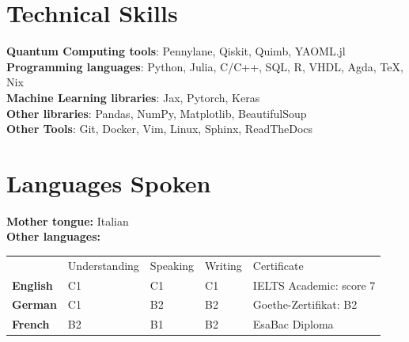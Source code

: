 \documentclass[letterpaper,11pt]{article}
\begin{document}
\section{Technical Skills}
 \begin{itemize}[leftmargin=0.15in, label={}]
    \small{\item{
     \textbf{Quantum Computing tools}{: Pennylane, Qiskit, Quimb, YAOML.jl}\\
     \textbf{Programming languages}{: Python, Julia, C/C++, SQL, R, VHDL, Agda, TeX, Nix} \\
     \textbf{Machine Learning libraries}{: Jax, Pytorch, Keras}\\
     \textbf{Other libraries}{: Pandas, NumPy, Matplotlib, BeautifulSoup}\\
     \textbf{Other Tools}{: Git, Docker, Vim, Linux, Sphinx, ReadTheDocs} \\
    }}
 \end{itemize}

%
\section{Languages Spoken}
\textbf{Mother tongue:} Italian\\
\textbf{Other languages:}\\
\setlength{\tabcolsep}{12pt} %
\hspace*{1cm}
\begin{tabular}{ll|l|l|l}
  \arrayrulecolor{alt} %
                   & \textcolor{alt}{Understanding} & \textcolor{alt}{Speaking} & \textcolor{alt}{Writing} & \textcolor{alt}{Certificate} \\
  \arrayrulecolor{black} %
  \textbf{English} & C1                             & C1                        & C1                       & IELTS Academic: score 7      \\
  \textbf{German}  & C1                             & B2                        & B2                       & Goethe-Zertifikat: B2        \\
  \textbf{French}  & B2                             & B1                        & B2                       & EsaBac Diploma               \\
  
\end{tabular}

%
\end{document}
